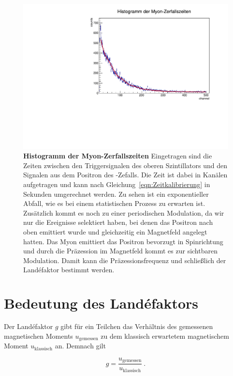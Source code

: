 \documentclass[a4paper,ngerman]{scrartcl}
\begin{document}
\begin{figure}[tbh!]
  \centering
  \includegraphics[width=\textwidth]{abbildungen/histogramm.pdf}
  \caption{\textbf{Histogramm der Myon-Zerfallszeiten}
  Eingetragen sind die Zeiten zwischen den Triggersignalen des oberen Szintillators und den
  Signalen aus dem Positron des \APmuon-Zefalls. Die Zeit ist dabei in Kanälen
  aufgetragen und kann nach Gleichung~\ref{eqn:Zeitkalibrierung} in
  Sekunden umgerechnet werden. Zu sehen ist ein exponentieller
  Abfall, wie es bei einem statistischen Prozess zu
  erwarten ist. Zusätzlich kommt es noch zu einer periodischen
  Modulation, da wir nur die Ereignisse selektiert haben, bei denen
  das Positron nach oben emittiert wurde und gleichzeitig ein Magnetfeld angelegt
  hatten. Das Myon emittiert das Positron bevorzugt in Spinrichtung
  und durch die Präzession im Magnetfeld kommt es zur sichtbaren
  Modulation. Damit kann die Präzessionsfrequenz und schließlich der
  Landéfaktor bestimmt werden.}

  \label{fig:zerfallszeiten}
\end{figure}

\clearpage
\section{Bedeutung des Landéfaktors}

Der Landéfaktor $g$ gibt für ein Teilchen das Verhältnis des gemessenen magnetischen Moments $ u_{\mathrm{gemessen}}$ zu dem klassisch erwartetem magnetischem Moment $u_{\mathrm{klassisch}}$ an. Demnach gilt

\begin{equation}
g = \frac{ u_{\mathrm{gemessen}} }{u_{\mathrm{klassisch}} } ~.
\end{equation}
\end{document}
